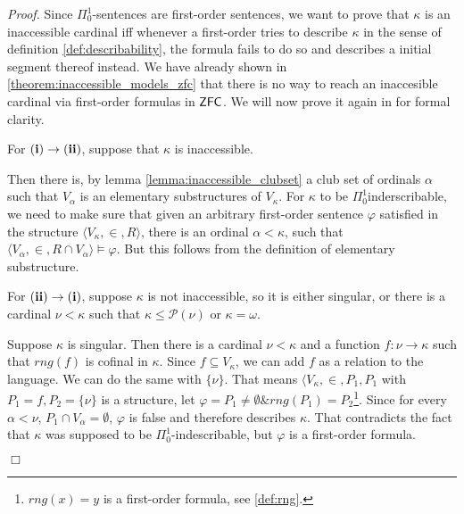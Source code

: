 \documentclass[12pt,a4paper]{article}
\newenvironment{proof}
{\noindent \textit{Proof.}}
{\hspace*{\fill} $\Box$}
\newcommand{\power}[1]{\ensuremath{\mathscr{P}} (#1)}
\newcommand{\then}{\rightarrow}
\newcommand{\et}{\mathrel{\&}}
\begin{document}


\begin{proof}
Since $\Pi^1_0$-sentences are first-order sentences, we want to prove that $\kappa$ is an inaccessible cardinal iff whenever a first-order tries to describe $\kappa$ in the sense of definition \ref{def:describability}, the formula fails to do so and describes a initial segment thereof instead.
We have already shown in \ref{theorem:inaccessible_models_zfc} that there is no way to reach an inaccesible cardinal via first-order formulas in $\sf{ZFC}$. We will now prove it again in for formal clarity.

For $\bold{(i) \then (ii)}$, suppose that $\kappa$ is inaccessible.

Then there is, by lemma \ref{lemma:inaccessible_clubset} a club set of ordinals $\alpha$ such that $V_\alpha$ is an elementary substructures of $V_\kappa$. For $\kappa$ to be $\Pi^1_0$inderscribable, we need to make sure that given an arbitrary first-order sentence $\varphi$ satisfied in the structure $\langle V_\kappa, \in, R \rangle$, there is an ordinal $\alpha < \kappa$, such that $\langle V_\alpha, \in, R \cap V_\alpha \rangle \models \varphi$. But this follows from the definition of elementary substructure.

For $\bold{(ii) \then (i)}$, suppose $\kappa$ is not inaccessible, so it is either singular, or there is a cardinal $\nu < \kappa$ such that $\kappa \leq \power{\nu}$ or $\kappa=\omega$. 


Suppose $\kappa$ is singular. Then there is a cardinal $\nu < \kappa$ and a function $f: \nu \then \kappa$ such that $rng(f)$ is cofinal in $\kappa$. Since $f \subseteq V_\kappa$, we can add $f$ as a relation to the language. We can do the same with $\{\nu\}$. That means $\langle V_\kappa, \in, P_1, P_1$ with $P_1 = f, P_2 = \{\nu\}$ is a structure, 
let $\varphi = P_1 \neq \emptyset \et rng(P_1) = P_2$\footnote{$rng(x)=y$ is a first-order formula, see \ref{def:rng}.}. Since for every $\alpha < \nu$, $P_1 \cap V_\alpha = \emptyset$, $\varphi$ is false and therefore describes $\kappa$. That contradicts the fact that $\kappa$ was supposed to be $\Pi^1_0$-indescribable, but $\varphi$ is a first-order formula.


\end{proof}
\end{document}
